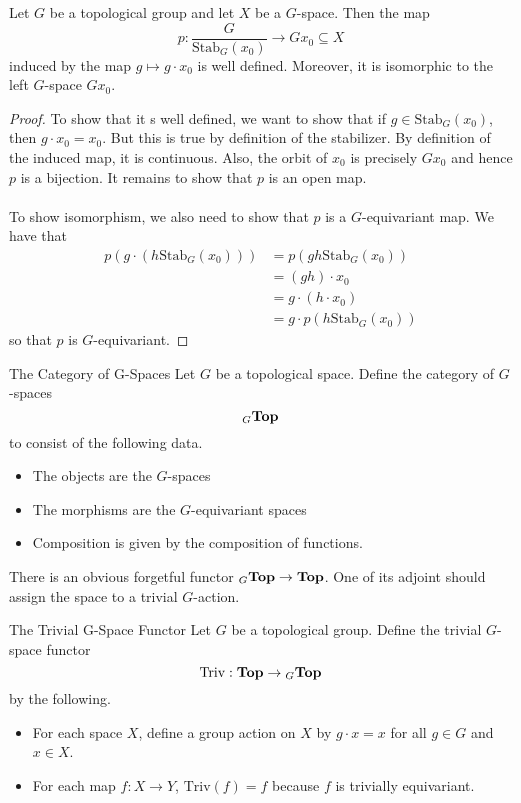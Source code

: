 \documentclass[a4paper]{article}
\begin{document}
\begin{thm}{}{} Let $G$ be a topological group and let $X$ be a $G$-space. Then the map $$p:\frac{G}{\text{Stab}_G(x_0)}\to Gx_0\subseteq X$$ induced by the map $g\mapsto g\cdot x_0$ is well defined. Moreover, it is isomorphic to the left $G$-space $Gx_0$. \tcbline
\begin{proof}
To show that it s well defined, we want to show that if $g\in\text{Stab}_G(x_0)$, then $g\cdot x_0=x_0$. But this is true by definition of the stabilizer. By definition of the induced map, it is continuous. Also, the orbit of $x_0$ is precisely $Gx_0$ and hence $p$ is a bijection. It remains to show that $p$ is an open map. \\~\\

To show isomorphism, we also need to show that $p$ is a $G$-equivariant map. We have that 
\begin{align*}
p(g\cdot(h\text{Stab}_G(x_0)))&=p(gh\text{Stab}_G(x_0))\\
&=(gh)\cdot x_0\\
&=g\cdot(h\cdot x_0)\\
&=g\cdot p(h\text{Stab}_G(x_0))
\end{align*}
so that $p$ is $G$-equivariant. 
\end{proof}
\end{thm}

\begin{defn}{The Category of G-Spaces}{} Let $G$ be a topological space. Define the category of $G$-spaces $${_G}\bold{Top}$$ to consist of the following data. 
\begin{itemize}
\item The objects are the $G$-spaces
\item The morphisms are the $G$-equivariant spaces
\item Composition is given by the composition of functions. 
\end{itemize}
\end{defn}

There is an obvious forgetful functor ${_G}\bold{Top}\to\bold{Top}$. One of its adjoint should assign the space to a trivial $G$-action. 

\begin{defn}{The Trivial G-Space Functor}{} Let $G$ be a topological group. Define the trivial $G$-space functor $$\text{Triv}:\bold{Top}\to{_G\bold{Top}}$$ by the following. 
\begin{itemize}
\item For each space $X$, define a group action on $X$ by $g\cdot x=x$ for all $g\in G$ and $x\in X$. 
\item For each map $f:X\to Y$, $\text{Triv}(f)=f$ because $f$ is trivially equivariant. 
\end{itemize}
\end{defn}
\end{document}
